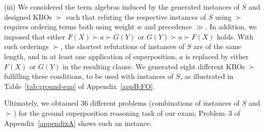 
\noindent(iii) We considered the term algebras induced by the generated
instances of $S$ and designed KBOs $\succ$ such that
refuting the respective instances of $S$ using $\succ$ requires
ordering terms both using weight $w$ and precedence $\gg$. %
In addition, we imposed that  either $F(X) \succ a \succ G(Y)$ 
or $G(Y) \succ a \succ F(X)$ holds. With such orderings $\succ$,
the shortest refutations of instances of $S$ are of the same length, and in
at least one application of superposition, $a$ is replaced by either $F(X)$ or $G(Y)$
in the resulting clause. %
We generated eight different KBOs $\succ$ fulfilling these conditions,
to be used with instances of $S$, as
illustrated in Table~\ref{tab:ground-sup} of Appendix~\ref{appB:FO}.\smallskip

Ultimately, we obtained 36 different problems (combinations of
instances of $S$ and $\succ$) for  the ground
superposition reasoning task of our exam; Problem~3 of
Appendix~\ref{appendixA} shows such an instance.
